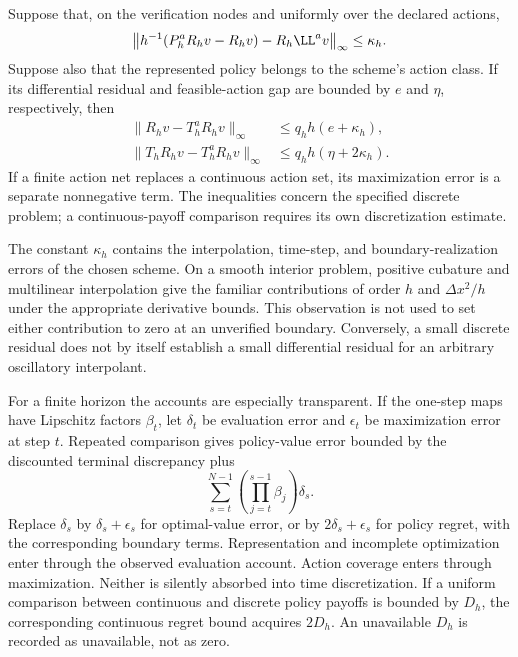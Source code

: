 \begin{proposition}\label{prop:bridge-r5}
Suppose that, on the verification nodes and uniformly over the declared actions,
\[
 \left\|h^{-1}(P_h^aR_hv-R_hv)-R_h\LL^av\right\|_\infty\leq\kappa_h.
\]
Suppose also that the represented policy belongs to the scheme's action class. If its differential residual and feasible-action gap are bounded by $e$ and $\eta$, respectively, then
\begin{align}
 \|R_hv-T_h^aR_hv\|_\infty&\leq q_hh(e+\kappa_h),\label{eq:bridge-eval}\\
 \|T_hR_hv-T_h^aR_hv\|_\infty&\leq q_hh(\eta+2\kappa_h).\label{eq:bridge-gap}
\end{align}
If a finite action net replaces a continuous action set, its maximization error is a separate nonnegative term. The inequalities concern the specified discrete problem; a continuous-payoff comparison requires its own discretization estimate.
\end{proposition}

The constant $\kappa_h$ contains the interpolation, time-step, and boundary-realization errors of the chosen scheme. On a smooth interior problem, positive cubature and multilinear interpolation give the familiar contributions of order $h$ and $\Delta x^2/h$ under the appropriate derivative bounds. This observation is not used to set either contribution to zero at an unverified boundary. Conversely, a small discrete residual does not by itself establish a small differential residual for an arbitrary oscillatory interpolant.

For a finite horizon the accounts are especially transparent. If the one-step maps have Lipschitz factors $\beta_t$, let $\delta_t$ be evaluation error and $\epsilon_t$ be maximization error at step $t$. Repeated comparison gives policy-value error bounded by the discounted terminal discrepancy plus
\begin{equation}\label{eq:finiteaccount-r5}
 \sum_{s=t}^{N-1}\left(\prod_{j=t}^{s-1}\beta_j\right)\delta_s.
\end{equation}
Replace $\delta_s$ by $\delta_s+\epsilon_s$ for optimal-value error, or by $2\delta_s+\epsilon_s$ for policy regret, with the corresponding boundary terms. Representation and incomplete optimization enter through the observed evaluation account. Action coverage enters through maximization. Neither is silently absorbed into time discretization. If a uniform comparison between continuous and discrete policy payoffs is bounded by $D_h$, the corresponding continuous regret bound acquires $2D_h$. An unavailable $D_h$ is recorded as unavailable, not as zero.

